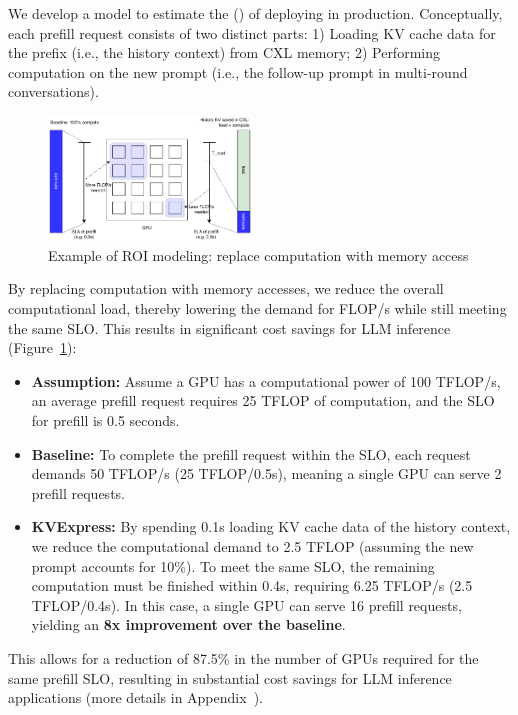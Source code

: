 We develop a model to estimate the \roifull (\roi) of deploying \tool in production.
Conceptually, each prefill request consists of two distinct parts: 1) Loading KV cache data for the prefix (i.e., the history context) from CXL memory; 2) Performing computation on the new prompt (i.e., the follow-up prompt in multi-round conversations).

\begin{figure}[ht!]
    \includegraphics[width=0.48\textwidth]{fig/future/roi_explanation.pdf}
 \caption[Example of ROI modeling]{Example of ROI modeling: replace computation with memory access}
    \label{fig:roi-modeling}
\end{figure}

By replacing computation with memory accesses, we reduce the overall computational load, thereby lowering the demand for FLOP/s while still meeting the same SLO. This results in significant cost savings for LLM inference (Figure~\ref{fig:roi-modeling}):

\begin{itemize}
\item \textbf{Assumption:} Assume a GPU has a computational power of 100 TFLOP/s, an average prefill request requires 25 TFLOP of computation, and the SLO for prefill is 0.5 seconds.
\item \textbf{Baseline:} To complete the prefill request within the SLO, each request demands 50 TFLOP/s (25 TFLOP/0.5s), meaning a single GPU can serve 2 prefill requests. 
\item \textbf{KVExpress:} By spending 0.1s loading KV cache data of the history context, we reduce the computational demand to 2.5 TFLOP (assuming the new prompt accounts for 10\%). To meet the same SLO, the remaining computation must be finished within 0.4s, requiring 6.25 TFLOP/s (2.5 TFLOP/0.4s). In this case, a single GPU can serve 16 prefill requests, yielding an \textbf{8x improvement over the baseline}.
\end{itemize}





This allows for a reduction of 87.5\% in the number of GPUs required for the same prefill SLO, resulting in substantial cost savings for LLM inference applications (more details in Appendix~\cite{roi_model}).


